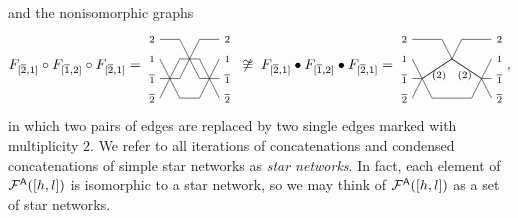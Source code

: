 \documentclass[11pt]{article}
\theoremstyle{definition}
\numberwithin{equation}{section}
\begin{document}
and the nonisomorphic graphs
\begin{equation}\label{eq:allbutone2}
  F_{[\ol2,1]} \circ F_{[\ol1,2]} \circ F_{[\ol2,1]} =
\begin{tikzpicture}[scale=.5,baseline=0]
\node at (-.4,1.5) {$\scriptstyle 2$};
\node at (-.4,0.5) {$\scriptstyle 1$};
\node at (-.4,-0.5) {$\scriptstyle{\ol1}$};
\node at (-.4,-1.5) {$\scriptstyle{\ol2}$};  
\node at (3.4,1.5) {$\scriptstyle 2$};
\node at (3.4,0.5) {$\scriptstyle 1$};
\node at (3.4,-0.5) {$\scriptstyle{\ol1}$};
\node at (3.4,-1.5) {$\scriptstyle{\ol2}$};  
\draw[-] (0,1.5) -- (1,1.5) -- (2,-0.5) -- (3,-0.5);
\draw[-] (0,0.5) -- (1,-1.5) -- (2,-1.5) -- (3,0.5);
\draw[-] (0,-0.5) -- (1,-0.5) -- (2,1.5) -- (3,1.5);
\draw[-] (0,-1.5) -- (1,0.5) -- (2,0.5) -- (3,-1.5);
\end{tikzpicture}
\; \not \cong \;
  F_{[\ol2,1]} \bullet F_{[\ol1,2]} \bullet F_{[\ol2,1]} =
\begin{tikzpicture}[scale=.5,baseline=0]
\node at (-0.9,1.5) {$\scriptstyle 2$};
\node at (-0.9,0.5) {$\scriptstyle 1$};
\node at (-0.9,-0.5) {$\scriptstyle{\ol1}$};
\node at (-0.9,-1.5) {$\scriptstyle{\ol2}$};  
\node at (2.15,-.35) {$\scriptstyle (2)$};
\node at (.85,-.35) {$\scriptstyle (2)$};
\node at (3.9,1.5) {$\scriptstyle 2$};
\node at (3.9,0.5) {$\scriptstyle 1$};
\node at (3.9,-0.5) {$\scriptstyle{\ol1}$};
\node at (3.9,-1.5) {$\scriptstyle{\ol2}$};  
\draw[-] (-0.5,1.5) -- (1,1.5) -- (1.5,0.5) -- (2,1.5) -- (3.5,1.5);
\draw[-] (-0.5,0.5) -- (-0,-0.5) -- (1.5,0.5) -- (3,-0.5) -- (3.5,0.5);
\draw[-] (-0.5,-0.5) -- (-0,-0.5) -- (1.5,0.5) -- (3,-0.5) -- (3.5,-0.5);
\draw[-] (-0.5,-1.5) -- (-0,-0.5) -- (.5,-1.5) -- (2.5,-1.5) -- (3,-0.5) -- (3.5,-1.5);
\end{tikzpicture},
\end{equation}
in which two pairs of edges are replaced by two single edges
marked with multiplicity $2$.
We refer to all iterations of concatenations and condensed concatenations
of simple star networks as {\em star networks}.
In fact, each element of $\mathcal F^{\mathsf{A}}([h,l])$ is isomorphic to a star network,
so we may think of $\mathcal F^{\mathsf{A}}([h,l])$ as a set of
star networks.
\end{document}
